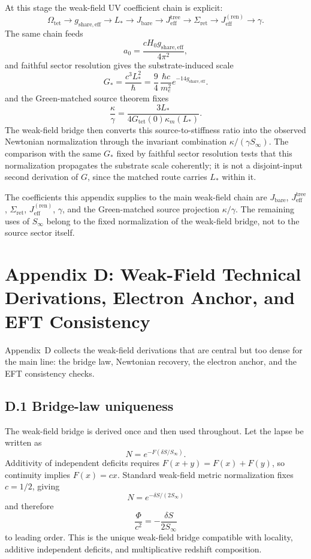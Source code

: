 \documentclass[11pt]{article}
\begin{document}
At this stage the weak-field UV coefficient chain is explicit:
\[
\Omega_{\mathrm{tet}}
\rightarrow
g_{\mathrm{share,eff}}
\rightarrow
L_*
\rightarrow
J_{\mathrm{bare}}
\rightarrow
J_{\mathrm{eff}}^{\mathrm{tree}}
\rightarrow
\Sigma_{\mathrm{ret}}
\rightarrow
J_{\mathrm{eff}}^{(\mathrm{ren})}
\rightarrow
\gamma.
\]
The same chain feeds
\[
a_0=\frac{cH_0g_{\mathrm{share,eff}}}{4\pi^2},
\]
and faithful sector resolution gives the substrate-induced scale
\[
G_*=\frac{c^3L_*^2}{\hbar}
=
\frac94\,\frac{\hbar c}{m_e^2}e^{-14g_{\mathrm{share,eff}}}.
\]
and the Green-matched source theorem fixes
\[
\frac{\kappa}{\gamma}
=
\frac{3L_*}{4G_{\mathrm{tet}}(0)\kappa_m(L_*)}.
\]
The weak-field bridge then converts this source-to-stiffness ratio into the observed Newtonian normalization through the invariant combination $\kappa/(\gamma S_\infty)$. The comparison with the same $G_*$ fixed by faithful sector resolution tests that this normalization propagates the substrate scale coherently; it is not a disjoint-input second derivation of $G$, since the matched route carries $L_*$ within it.

The coefficients this appendix supplies to the main weak-field chain are $J_{\mathrm{bare}}$, $J_{\mathrm{eff}}^{\mathrm{tree}}$, $\Sigma_{\mathrm{ret}}$, $J_{\mathrm{eff}}^{(\mathrm{ren})}$, $\gamma$, and the Green-matched source projection $\kappa/\gamma$. The remaining uses of $S_\infty$ belong to the fixed normalization of the weak-field bridge, not to the source sector itself.

\section*{Appendix D: Weak-Field Technical Derivations, Electron Anchor, and EFT Consistency}

Appendix~D collects the weak-field derivations that are central but too dense for the main line: the bridge law, Newtonian recovery, the electron anchor, and the EFT consistency checks.

\subsection*{D.1 Bridge-law uniqueness}

The weak-field bridge is derived once and then used throughout. Let the lapse be written as
\[
N=e^{-F(\delta S/S_\infty)}.
\]
Additivity of independent deficits requires $F(x+y)=F(x)+F(y)$, so continuity implies $F(x)=cx$. Standard weak-field metric normalization fixes $c=1/2$, giving
\[
N=e^{-\delta S/(2S_\infty)}
\]
and therefore
\[
\frac{\Phi}{c^2}=-\frac{\delta S}{2S_\infty}
\]
to leading order. This is the unique weak-field bridge compatible with locality, additive independent deficits, and multiplicative redshift composition.
\end{document}
